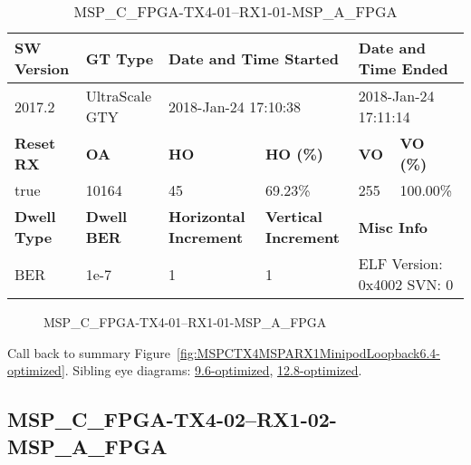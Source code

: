 \begin{table}[h]
\centering
\caption{MSP\_C\_FPGA-TX4-01--RX1-01-MSP\_A\_FPGA}
\label{tab:MSPCFPGATX401RX101MSPAFPGA6.4-optimized}
\begin{tabular}{@{}|l|l|l|l|l|l|@{}}
\toprule
\textbf{SW Version}                & \textbf{GT Type}   & \multicolumn{2}{l|}{\textbf{Date and Time Started}}            & \multicolumn{2}{l|}{\textbf{Date and Time Ended}}        \\ \midrule
2017.2                       & UltraScale GTY          & \multicolumn{2}{l|}{2018-Jan-24 17:10:38}                   & \multicolumn{2}{l|}{2018-Jan-24 17:11:14}               \\ \midrule
\textbf{Reset RX}                  & \textbf{OA} & \textbf{HO}   & \textbf{HO (\%)} & \textbf{VO} & \textbf{VO (\%)} \\ \midrule
true & 10164        & 45          & 69.23\%        & 255        & 100.00\%       \\ \midrule
\textbf{Dwell Type}                & \textbf{Dwell BER} & \textbf{Horizontal Increment} & \textbf{Vertical Increment}    & \multicolumn{2}{l|}{\textbf{Misc Info}}                  \\ \midrule
BER                            & 1e-7        & 1        & 1           & \multicolumn{2}{l|}{ELF Version: 0x4002 SVN: 0}                         \\ \bottomrule
\end{tabular}
\end{table}

\begin{figure}[h]
\caption{MSP\_C\_FPGA-TX4-01--RX1-01-MSP\_A\_FPGA} \label{fig:MSPCFPGATX401RX101MSPAFPGA6.4-optimized}
\end{figure}

Call back to summary Figure~\ref{fig:MSPCTX4MSPARX1MinipodLoopback6.4-optimized}.
Sibling eye diagrams: \hyperref[sec:MSPCFPGATX401RX101MSPAFPGA9.6-optimized]{9.6-optimized}, \hyperref[sec:MSPCFPGATX401RX101MSPAFPGA12.8-optimized]{12.8-optimized}.

\clearpage
\newpage


\subsection{MSP\_C\_FPGA-TX4-02--RX1-02-MSP\_A\_FPGA}\label{sec:MSPCFPGATX402RX102MSPAFPGA6.4-optimized}

